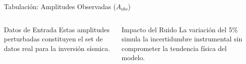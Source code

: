 \begin{frame}{Tabulación: Amplitudes Observadas ($A_{obs}$)}
\begin{columns}[T]
        \vspace{0.8cm}
        
        \begin{block}{Datos de Entrada}
            \scriptsize
            Estas amplitudes perturbadas constituyen el set de datos real para la inversión sísmica.
        \end{block}

        \vspace{0.4cm}

        \begin{block}{Impacto del Ruido}
            \scriptsize
            La variación del 5\% simula la incertidumbre instrumental sin comprometer la tendencia física del modelo.
        \end{block}
    \end{columns}

\end{frame}